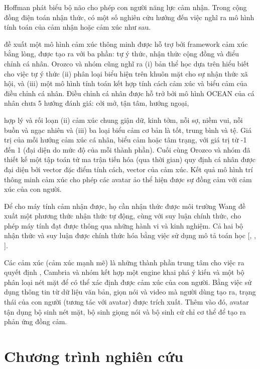 \documentclass{article}
\begin{document}
Hoffman phát biểu bộ não cho phép con người năng lực cảm nhận. Trong cộng đồng điện toán nhận thức, có một số nghiên cứu hướng đến việc nghĩ ra mô hình tính toán của cảm nhận hoặc cảm xúc như sau.

 đề xuất một mô hình cảm xúc thông minh được hỗ trợ bởi framework cảm xúc bằng lòng, được tạo ra với ba phần: tự ý thức, nhận thức cộng đồng và điểu chỉnh cá nhân. Orozco và nhóm cũng nghĩ ra (i) bản thể học dựa trên hiểu biết cho việc tự ý thức (ii) phân loại biểu hiện trên khuôn mặt cho sự nhận thức xã hội, và (iii) một mô hình tính toán kết hợp tính cách cảm xúc và biểu cảm của điều chỉnh cá nhân. Điều chỉnh cá nhân được hỗ trở bởi mô hình OCEAN của cá nhân chưa 5 hướng đánh giá: cởi mở, tận tâm, hướng ngoại,

hợp lý và rối loạn (ii) cảm xúc chung  giận dữ, kinh tởm, nỗi sợ, niềm vui, nỗi buồn và ngạc nhiên và (iii) ba loại biểu cảm cơ bản là tốt, trung bình và tệ. Giá trị của mỗi hướng cảm xúc cá nhân, biểu cảm hoặc tâm trạng, với giá trị từ -1 đến 1 (đại diện do mức độ của mỗi thành phần). Cuối cùng Orozco và nhóm đã thiết kế một tập toán tử ma trận tiến hóa (qua thời gian) quy định cá nhân được đại diện bởi vector đặc điểm tính cách, vector của cảm xúc. Kết quả mô hình trí thông minh cảm xúc cho phép các avatar ảo thể hiện được sự đồng cảm với cảm xúc của con người.

Để cho máy tính cảm nhận được, họ cần nhận thức được môi trường \citep{wang2008concept} Wang đề xuất một phương thức nhận thức tự động, cùng với suy luận chính thức, cho phép máy tính đạt được thông qua những hành vi và kinh nghiệm. Cả hai bộ nhận thức và suy luận được chính thức hóa bằng việc sử dụng mô tả toán học [, \citet{wang2006cognitive}, \citet{wang2006informatics}].

Các cảm xúc (cảm xúc mạnh mẽ) là những thành phần trung tâm cho việc ra quyết định , Cambria và nhóm kết hợp một engine khai phá ý kiến và một bộ phân loại nét mặt để có thể xác định được cảm xúc của con người. Bằng việc sử dụng thông tin từ dữ liệu văn bản, giọn nói và video mà người dùng tạo ra, trạng thái của con người (tương tác với avatar) được trích xuất. Thêm vào đó, avatar tận dụng bộ sinh nét mặt, bộ sinh giọng nói và bộ sinh cử chỉ cơ thể để tạo ra phản ứng đồng cảm.

\section{Chương trình nghiên cứu}\label{sec:4-research-agenda}
\end{document}
